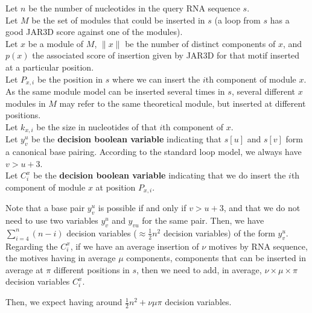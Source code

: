 \documentclass{article}
\begin{document}
Let $n$ be the number of nucleotides in the query RNA sequence $s$.\\
Let $M$ be the set of modules that could be inserted in $s$ (a loop from $s$ has a good JAR3D score against one of the modules).\\
Let $x$ be a module of $M$, $\|x\|$ be the number of distinct components of $x$, and $p(x)$ the associated score of insertion given by JAR3D for that motif inserted at a particular position.\\
Let $P_{x,i}$ be the position in $s$ where we can insert the $i$th component of module $x$.\\
As the same module model can be inserted several times in $s$, several different $x$ modules in $M$ may refer to the same theoretical module, but inserted at different positions.\\
Let $k_{x,i}$ be the size in nucleotides of that $i$th component of $x$.\\
Let $y^u_v$ be the \textbf{decision boolean variable} indicating that $s[u]$ and $s[v]$ form a canonical base pairing. According to the standard loop model, we always have $v > u + 3$.\\
Let $C^x_i$ be the \textbf{decision boolean variable} indicating that we do insert the $i$th component of module $x$ at position $P_{x,i}$.


Note that a base pair $y^u_v$ is possible if and only if $v>u+3$, and that we do not need to use two variables $y^u_v$ and $y_{vu}$ for the same pair. 
Then, we have $\sum_{i=4}^n (n-i)$ decision variables ($\approx \frac{1}{2}n^2$ decision variables) of the form $y^u_v$.
Regarding the $C^x_i$, if we have an average insertion of $\nu$ motives by RNA sequence, the motives having in average $\mu$ components, components that can be inserted in average at $\pi$ different positions in $s$,
then we need to add, in average, $\nu \times \mu \times \pi$ decision variables $C^x_i$.

Then, we expect having around $\frac{1}{2}n^2+\nu \mu \pi$ decision variables.

\newpage
\end{document}
